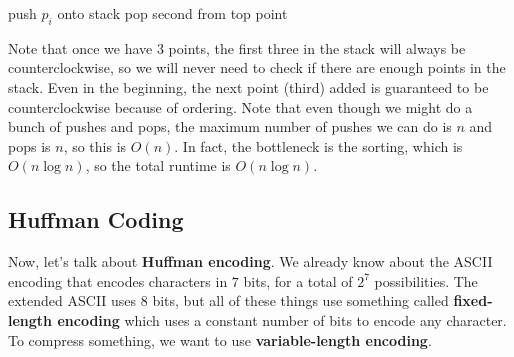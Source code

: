 \documentclass{article}
\begin{document}
\begin{example}
\begin{algorithm}[H]
\begin{algorithmic}
              \State push $p_i$ onto stack 
                \State pop second from top point 
              \EndWhile
            \EndFor 
            \State {} 
          \EndFunction
        \end{algorithmic}
      \end{algorithm}
      Note that once we have 3 points, the first three in the stack will always be counterclockwise, so we will never need to check if there are enough points in the stack. Even in the beginning, the next point (third) added is guaranteed to be counterclockwise because of ordering. Note that even though we might do a bunch of pushes and pops, the maximum number of pushes we can do is $n$ and pops is $n$, so this is $O(n)$. In fact, the bottleneck is the sorting, which is $O(n \log{n})$, so the total runtime is $O(n \log{n})$. 
    \end{example}

  \subsection{Huffman Coding}

    Now, let's talk about \textbf{Huffman encoding}. We already know about the ASCII encoding that encodes characters in $7$ bits, for a total of $2^7$ possibilities. The extended ASCII uses $8$ bits, but all of these things use something called \textbf{fixed-length encoding} which uses a constant number of bits to encode any character. To compress something, we want to use \textbf{variable-length encoding}. 
\end{document}
